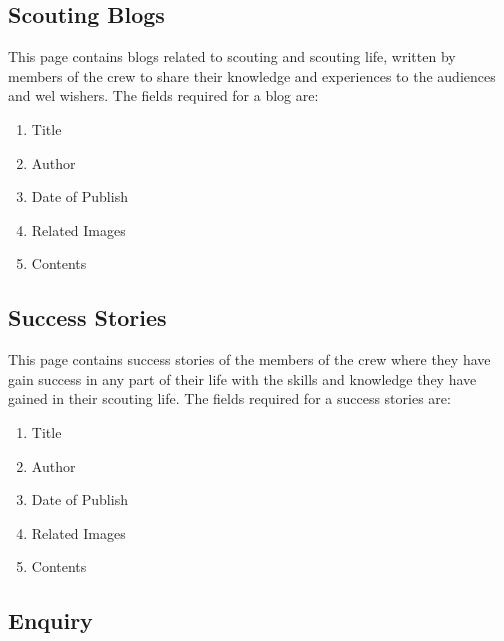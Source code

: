 		\subsection{Scouting Blogs}
		This page contains blogs related to scouting and scouting life, written by members of the crew to share their knowledge and experiences to the audiences and wel wishers. The fields required for a blog are:
		\begin{enumerate}
			\item Title
			\item Author
			\item Date of Publish
			\item Related Images
			\item Contents
		\end{enumerate}

		\subsection{Success Stories}
		This page contains success stories of the members of the crew where they have gain success in any part of their life with the skills and knowledge they have gained in their scouting life. The fields required for a success stories are:
		\begin{enumerate}
			\item Title
			\item Author
			\item Date of Publish
			\item Related Images
			\item Contents
		\end{enumerate}

		\subsection{Enquiry}

		